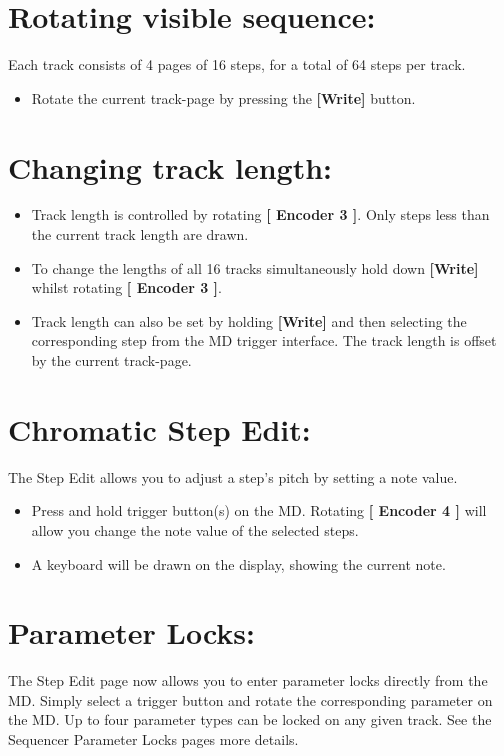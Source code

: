 \vspace{-0.3cm}

\section{Rotating visible sequence:}
Each track consists of 4 pages of 16 steps, for a total of 64 steps per track.
\begin{itemize}
\item Rotate the current track-page by pressing the \textbf{[Write] }button.
\end{itemize}

\vspace{-0.3cm}

\section{Changing track length:}
\begin{itemize}
\item Track length is controlled by rotating \textbf{[ Encoder 3 ]}. Only steps less than the current track length are drawn.
\item To change the lengths of all 16 tracks simultaneously hold down \textbf{[Write]} whilst rotating \textbf{[ Encoder 3 ]}.
\item Track length can also be set by holding \textbf{[Write]} and then selecting the corresponding step from the MD trigger interface. The track length is offset by the current track-page.
\end{itemize}

\section{Chromatic Step Edit:}
The Step Edit allows you to adjust a step's pitch by setting a note value. 
\begin{itemize}
\item Press and hold trigger button(s) on the MD. Rotating \textbf{[ Encoder 4 ]} will allow you change the note value of the selected steps.
\item A keyboard will be drawn on the display, showing the current note.
\end{itemize}

\section{Parameter Locks:}
The Step Edit page now allows you to enter parameter locks directly from the MD. Simply select a trigger button and rotate the corresponding parameter on the MD. Up to four parameter types can be locked on any given track. See the Sequencer Parameter Locks pages more details.

